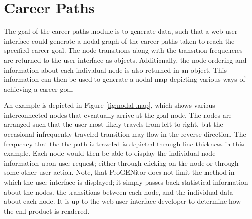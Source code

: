 \section{Career Paths}
\label{sect:career-paths}
The goal of the career paths module is to generate data, such that a web user
interface could generate a nodal graph of the career paths taken to reach the
specified career goal.  The node transitions along with the transition
frequencies are returned to the user interface as objects.  Additionally,
the node ordering and information about each individual node is also returned in
an object.  This information can then be used to generate a nodal map
depicting various ways of achieving a career goal.  

An example is depicted in Figure \ref{fig:nodal map}, which shows various
interconnected nodes that eventually arrive at the goal node.  The nodes are
arranged such that the user most likely travels from left to right, but the
occasional infrequently traveled transition may flow in the reverse direction. 
The frequency that the the path is traveled is depicted through line thickness
in this example.  Each node would then be able to display the individual node
information upon user request; either through clicking on the node or through
some other user action.  Note, that ProGENitor does not limit the method in
which the user interface is displayed; it simply passes back statistical
information about the nodes, the transitions between each node, and the
individual data about each node.  It is up to the web user interface developer
to determine how the end product is rendered.


\usetikzlibrary{shapes,arrows,chains}

